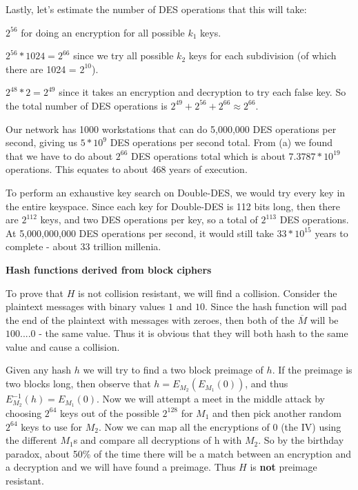\documentclass[12pt]{article}
\begin{document}
\begin{list}{.}{}
\begin{list}{)}{}
Lastly, let's estimate the number of DES operations that this will take:
\begin{list}{\textbullet}{}
\item $2^{56}$ for doing an encryption for all possible $k_1$ keys.
\item $2^{56} * 1024 = 2^{66}$ since we try all possible $k_2$ keys for each
subdivision (of which there are 1024 = $2^{10}$).
\item $2^{48} * 2 = 2^{49}$ since it takes an encryption and decryption to try
each false key.
So the total number of DES operations is $2^{49} + 2^{56} + 2^{66} \approx
2^{66}$.
\end{list}

\item Our network has 1000 workstations that can do 5,000,000 DES operations
per second, giving us $5 * 10^9$ DES operations per second total.  From (a) we
found that we have to do about $2^{66}$ DES operations total which is about
$7.3787 * 10^{19}$ operations.  This equates to about 468 years of execution.

To perform an exhaustive key search on Double-DES, we would try every key in the
entire keyspace.  Since each key for Double-DES is 112 bits long, then there are
$2^{112}$ keys, and two DES operations per key, so a total of $2^{113}$ DES
operations.  At 5,000,000,000 DES operations per second, it would still take
$33*10^{15}$ years to complete - about 33 trillion millenia.
\end{list}

\item \textbf{Hash functions derived from block ciphers}
\begin{list}{)}{}

\item To prove that $H$ is not collision resistant, we will find a collision.
Consider the plaintext messages with binary values $1$ and $10$.  Since the hash
function will pad the end of the plaintext with messages with zeroes, then both
of the $\overline{M}$ will be $100....0$ - the same value.  Thus it is obvious
that they will both hash to the same value and cause a collision.

\item Given any hash $h$ we will try to find a two block preimage of $h$.  If
the preimage is two blocks long, then observe that $h = E_{M_2}(E_{M_1}(0))$,
and thus $E^{-1}_{M_2}(h) = E_{M_1}(0)$.  Now we will attempt a meet in the
middle attack by choosing $2^{64}$ keys out of the possible $2^{128}$ for $M_1$
and then pick another random $2^{64}$ keys to use for $M_2$.  Now we can map all
the encryptions of 0 (the IV) using the different $M_1$s and compare all
decryptions of h with $M_2$.  So by the birthday paradox, about 50\% of the
time there will be a match between an encryption and a decryption and we will
have found a preimage.  Thus $H$ is \textbf{not} preimage resistant.


\end{list}
\end{list}
\end{document}
